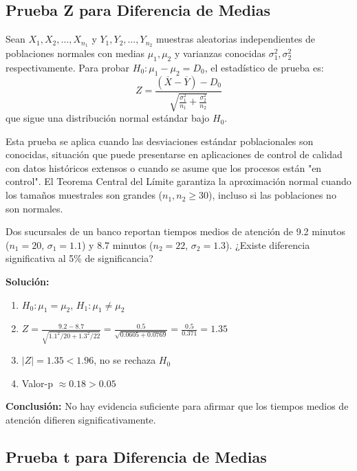 \subsection{Prueba Z para Diferencia de Medias}

\begin{theorem}
Sean $X_1, X_2, \ldots, X_{n_1}$ y $Y_1, Y_2, \ldots, Y_{n_2}$ muestras aleatorias independientes de poblaciones normales con medias $\mu_1, \mu_2$ y varianzas conocidas $\sigma_1^2, \sigma_2^2$ respectivamente. Para probar $H_0: \mu_1 - \mu_2 = D_0$, el estadístico de prueba es:
\[
Z = \frac{(\overline{X} - \overline{Y}) - D_0}{\sqrt{\frac{\sigma_1^2}{n_1} + \frac{\sigma_2^2}{n_2}}}
\]
que sigue una distribución normal estándar bajo $H_0$.
\end{theorem}

\begin{remark}
Esta prueba se aplica cuando las desviaciones estándar poblacionales son conocidas, situación que puede presentarse en aplicaciones de control de calidad con datos históricos extensos o cuando se asume que los procesos están "en control". El Teorema Central del Límite garantiza la aproximación normal cuando los tamaños muestrales son grandes ($n_1, n_2 \geq 30$), incluso si las poblaciones no son normales.
\end{remark}

\begin{example}
Dos sucursales de un banco reportan tiempos medios de atención de 9.2 minutos ($n_1=20$, $\sigma_1=1.1$) y 8.7 minutos ($n_2=22$, $\sigma_2=1.3$). ¿Existe diferencia significativa al 5\% de significancia?

\textbf{Solución:}
\begin{enumerate}
    \item $H_0: \mu_1 = \mu_2$, $H_1: \mu_1 \neq \mu_2$
    \item $Z = \frac{9.2-8.7}{\sqrt{1.1^2/20 + 1.3^2/22}} = \frac{0.5}{\sqrt{0.0605 + 0.0769}} = \frac{0.5}{0.371} = 1.35$
    \item $|Z| = 1.35 < 1.96$, no se rechaza $H_0$
    \item Valor-p $\approx 0.18 > 0.05$
\end{enumerate}
\textbf{Conclusión:} No hay evidencia suficiente para afirmar que los tiempos medios de atención difieren significativamente.
\end{example}

\subsection{Prueba t para Diferencia de Medias}

